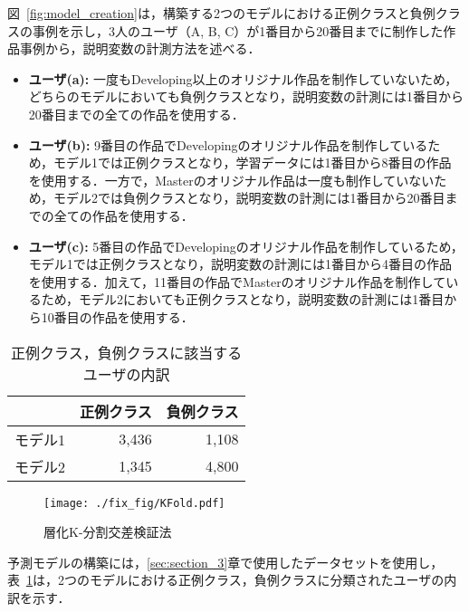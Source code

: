 \documentclass[submit]{ipsj}
\begin{document}
図~\ref{fig:model_creation}は，構築する2つのモデルにおける正例クラスと負例クラスの事例を示し，3人のユーザ（A, B, C）が1番目から20番目までに制作した作品事例から，説明変数の計測方法を述べる．

\begin{itemize}
\item \textbf{ユーザ(a): }一度もDeveloping以上のオリジナル作品を制作していないため，どちらのモデルにおいても負例クラスとなり，説明変数の計測には1番目から20番目までの全ての作品を使用する．
\item \textbf{ユーザ(b): }9番目の作品でDevelopingのオリジナル作品を制作しているため，モデル1では正例クラスとなり，学習データには1番目から8番目の作品を使用する．一方で，Masterのオリジナル作品は一度も制作していないため，モデル2では負例クラスとなり，説明変数の計測には1番目から20番目までの全ての作品を使用する．
\item \textbf{ユーザ(c): }5番目の作品でDevelopingのオリジナル作品を制作しているため，モデル1では正例クラスとなり，説明変数の計測には1番目から4番目の作品を使用する．加えて，11番目の作品でMasterのオリジナル作品を制作しているため，モデル2においても正例クラスとなり，説明変数の計測には1番目から10番目の作品を使用する．
\end{itemize}

\begin{table}[t]
	\caption{正例クラス，負例クラスに該当するユーザの内訳}
	\begin{center}
		\begin{tabular}{l|p{2mm}|p{2mm}}
		\hline
     		& \multicolumn{1}{c|}{正例クラス} & \multicolumn{1}{c}{負例クラス} \\ \hline
		\multicolumn{1}{l|}{モデル1} & \multicolumn{1}{r|}{3,436}  & \multicolumn{1}{r}{1,108}  \\
		\multicolumn{1}{l|}{モデル2} & \multicolumn{1}{r|}{1,345}  & \multicolumn{1}{r}{4,800}  \\ \hline
		\end{tabular}
	\end{center}
	\label{tab:model_classes}
\end{table}

\begin{figure}[t]
    \centering
    \texttt{[image: ./fix\_fig/KFold.pdf]}
    \caption{層化K-分割交差検証法}
    \label{fig:kfold}
\end{figure}

予測モデルの構築には，\ref{sec:section_3}章で使用したデータセットを使用し，表~\ref{tab:model_classes}は，2つのモデルにおける正例クラス，負例クラスに分類されたユーザの内訳を示す．
\end{document}
